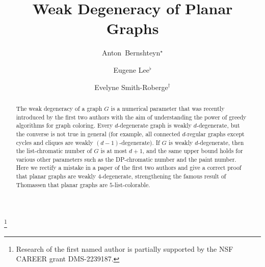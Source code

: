 \documentclass[11pt]{article}
\date{}
\theoremstyle{slantthm}
\numberwithin{equation}{section}
\theoremstyle{definition}
\numberwithin{equation}{section}
\newcommand{\0}{\varnothing}
\newcommand\blfootnote[1]{%
  \begingroup
  \renewcommand\thefootnote{}\footnote{#1}%
  \addtocounter{footnote}{-1}%
  \endgroup
}
\begin{document}



\author{Anton~Bernshteyn$^\star$}
\author{Eugene Lee$^\flat$}
\author{Evelyne Smith-Roberge$^\dagger$}



\title{Weak Degeneracy of Planar Graphs}
\date{}

\maketitle

\blfootnote{Research of the first named author is partially supported by the NSF CAREER grant DMS-2239187.}



\begin{abstract}
    \noindent The weak degeneracy of a graph $G$ is a numerical parameter that was recently introduced by the first two authors with the aim of understanding the power of greedy algorithms for graph coloring. Every $d$-degenerate graph is weakly $d$-degenerate, but the converse is not true in general (for example, all connected $d$-regular graphs except cycles and cliques are weakly $(d-1)$-degenerate). If $G$ is weakly $d$-degenerate, then the list-chromatic number of $G$ is at most $d+1$, and the same upper bound holds for various other parameters such as the DP-chromatic number and the paint number. Here we rectify a mistake in a paper of the first two authors and give a correct proof that planar graphs are weakly $4$-degenerate, strengthening the famous result of Thomassen that planar graphs are $5$-list-colorable. 
\end{abstract}
\end{document}
